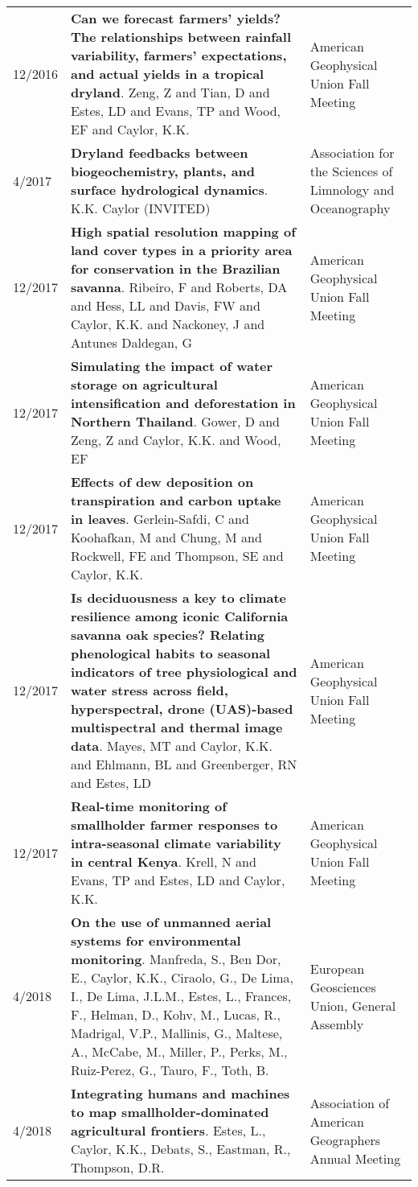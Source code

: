 \begin{longtable}{lp{10.0cm}p{4.5cm}}
 12/2016 & {\bf Can we forecast farmers' yields? The relationships between rainfall variability, farmers' expectations, and actual yields in a tropical dryland}. Zeng, Z and Tian, D and Estes, LD and Evans, TP and Wood, EF and Caylor, K.K.  & American Geophysical Union Fall Meeting\\
 4/2017 & {\bf Dryland feedbacks between biogeochemistry, plants, and surface hydrological dynamics}. K.K. Caylor (INVITED) & Association for the Sciences of Limnology and Oceanography\\
 12/2017 & {\bf High spatial resolution mapping of land cover types in a priority area for conservation in the Brazilian savanna}. Ribeiro, F and Roberts, DA and Hess, LL and Davis, FW and Caylor, K.K. and Nackoney, J and Antunes Daldegan, G  & American Geophysical Union Fall Meeting\\
 12/2017 & {\bf Simulating the impact of water storage on agricultural intensification and deforestation in Northern Thailand}. Gower, D and Zeng, Z and Caylor, K.K. and Wood, EF  & American Geophysical Union Fall Meeting\\
 12/2017 & {\bf Effects of dew deposition on transpiration and carbon uptake in leaves}. Gerlein-Safdi, C and Koohafkan, M and Chung, M and Rockwell, FE and Thompson, SE and Caylor, K.K.  & American Geophysical Union Fall Meeting\\
 12/2017 & {\bf Is deciduousness a key to climate resilience among iconic California savanna oak species? Relating phenological habits to seasonal indicators of tree physiological and water stress across field, hyperspectral, drone (UAS)-based multispectral and thermal image data}. Mayes, MT and Caylor, K.K. and Ehlmann, BL and Greenberger, RN and Estes, LD  & American Geophysical Union Fall Meeting\\
 12/2017 & {\bf Real-time monitoring of smallholder farmer responses to intra-seasonal climate variability in central Kenya}. Krell, N and Evans, TP and Estes, LD and Caylor, K.K.  & American Geophysical Union Fall Meeting\\
 4/2018 & {\bf On the use of unmanned aerial systems for environmental monitoring}. Manfreda, S., Ben Dor, E., Caylor, K.K., Ciraolo, G., De Lima, I., De Lima, J.L.M., Estes, L., Frances, F., Helman, D., Kohv, M., Lucas, R., Madrigal, V.P., Mallinis, G., Maltese, A., McCabe, M., Miller, P., Perks, M., Ruiz-Perez, G., Tauro, F., Toth, B.  & European Geosciences Union, General Assembly 
\\
 4/2018 & {\bf Integrating humans and machines to map smallholder-dominated agricultural frontiers}. Estes, L., Caylor, K.K., Debats, S., Eastman, R., Thompson, D.R.   & Association of American Geographers Annual Meeting\\

\end{longtable}
